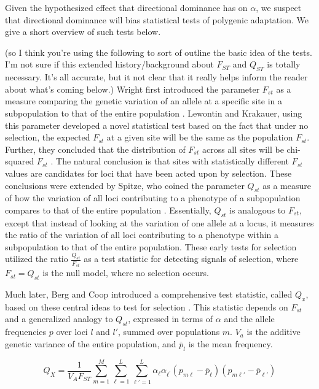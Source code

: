 \documentclass[a4paper,12pt]{article}
\newcommand{\jb}[1]{{\color{blue} (#1)} }
\begin{document}
Given the hypothesized effect that directional dominance has on
$\alpha$, we suspect that directional dominance will bias statistical
tests of polygenic adaptation. We give a short overview of such tests
below.  


\jb{so I think you're using the following to sort of outline the basic idea of the tests. I'm not sure if this extended history/background about $F_{ST}$ and $Q_{ST}$ is totally necessary. It's all accurate, but it not clear that it really helps inform the reader about what's coming below.}
Wright first introduced the parameter $F_{st}$ as a measure comparing
the genetic variation of an allele at a specific site in a subpopulation to that of the entire population
\cite{Fst}. Lewontin and Krakauer, using this parameter developed a
novel statistical test based on the fact
that under no selection, the expected $F_{st}$ at a given site will be the same
as the population $F_{st}$. Further, they concluded that the
distribution of $F_{st}$ across all sites will be chi-squared
$F_{st}$ \cite{firstseltest}. The natural conclusion is that sites
with statistically different $F_{st}$ values are candidates for loci
that have been acted upon by selection. These conclusions were extended by Spitze, who coined the
parameter $Q_{st}$ as a measure of how the variation of all loci
contributing to a phenotype of a subpopulation compares to that of the entire
population \cite{Qst}. Essentially, $Q_{st}$ is analogous to $F_{st}$,
except that instead of looking at the variation of one allele at a
locus, it measures the ratio of the variation of all loci contributing to a
phenotype within a subpopulation to that of the entire population. These early tests for selection utilized the ratio
$\frac{Q_{st}}{F_{st}}$ as a test statistic for detecting signals of
selection, where $F_{st} = Q_{st}$ is the null model, where no
selection occurs.

Much later, Berg and Coop introduced a comprehensive test statistic,
called $Q_x$, based on these central ideas to test
for selection \cite{berg}. This statistic depends on $F_{st}$ and
a generalized analogy to $Q_{st}$, expressed in terms of $\alpha$ and
the allele frequencies $p$ over loci $l$ and $l'$, summed over
populations $m$. $V_a$ is the additive genetic variance of the entire
population, and $\overline{p}_l$ is the mean frequency.

\begin{equation} \label{Qxraw}
  Q_X = \frac{1}{V_A F_{ST}} \sum_{m=1}^M \sum_{\ell=1}^L \sum_{\ell\prime=1}^L \alpha_{\ell} \alpha_{\ell^{\prime}}\left(p_{m\ell} - \overline{p}_\ell \right)\left(p_{m \ell\prime} - \overline{p}_{\ell\prime}\right)
\end{equation}
\end{document}
